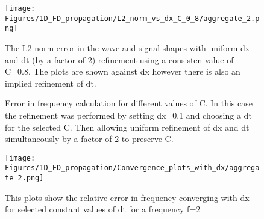 % 

\begin{figure}
\texttt{[image: Figures/1D\_FD\_propagation/L2\_norm\_vs\_dx\_C\_0\_8/aggregate\_2.png]}
\caption{The L2 norm error in the wave and signal shapes with uniform dx and dt (by a factor of 2) refinement using a consisten value of C=0.8. The plots are shown against dx however there is also an implied refinement of dt.}
\end{figure}

\begin{figure}
    \begin{center}
        
        \caption{Error in frequency calculation for different values of C. In this case the refinement was performed by setting dx=0.1 and choosing a dt for the selected C. Then allowing uniform refinement of dx and dt simultaneously by a factor of 2 to preserve C.}
    \end{center}
    
\end{figure}


\begin{figure}
\texttt{[image: Figures/1D\_FD\_propagation/Convergence\_plots\_with\_dx/aggregate\_2.png]}
\caption{This plots show the relative error in frequency converging with dx for selected constant values of dt for a frequency f=2}
\end{figure}

